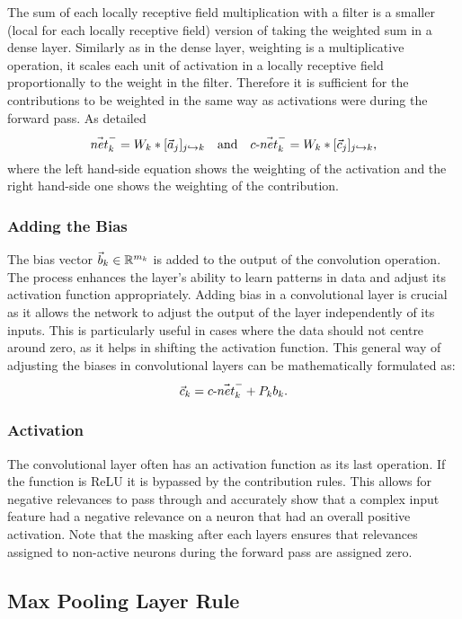 The sum of each locally receptive field multiplication with a filter is a smaller (local for each locally receptive field) version of taking the weighted sum in a dense layer. Similarly as in the dense layer, weighting is a multiplicative operation, it scales each unit of activation in a locally receptive field proportionally to the weight in the filter. Therefore it is sufficient for the contributions to be
weighted in the same way as activations were during the forward pass. As detailed
\begin{equation}
    \vec{net}_{k}^- = W_k\ast[\vec{a}_j]_{j\hookrightarrow k}\quad\mbox{and}\quad
   \text{$c$-}\vec{net}_{k}^- = W_k\ast[\vec{c}_j]_{j\hookrightarrow k},
\end{equation}
where the left hand-side equation shows the weighting of the activation and the right hand-side one shows the weighting of the contribution.
\subsubsection{Adding the Bias}

The bias vector \(\vec{b}_k \in \mathbb{R}^{m_k}\) is added to the output of the convolution operation. The process enhances the layer’s ability to learn patterns in data and adjust its activation function appropriately. Adding bias in a convolutional layer is crucial as it allows the network to adjust the output of the layer independently of its inputs. This is particularly useful in cases where the data should not centre around zero, as it helps in shifting the activation function. This general way of adjusting the biases in convolutional layers can be mathematically formulated as:
\begin{equation}
   \vec{c}_k =\text{$c$-}\vec{net}_{k}^- +  P_{k}{b}_k.
\end{equation} 
\subsubsection{Activation}
The convolutional layer often has an activation function as its last operation. If the function is ReLU it is bypassed by the contribution rules. This allows for negative relevances to pass through and accurately show that a complex input feature had a negative relevance on a neuron that had an overall positive activation. Note that the masking after each layers ensures that relevances assigned to non-active neurons during the forward pass are assigned zero.  


\subsection{Max Pooling Layer Rule}

